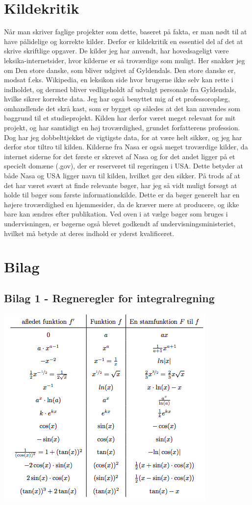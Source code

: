\documentclass[12pt]{article}
\numberwithin{equation}{section}
\begin{document}
\section{Kildekritik}
Når man skriver faglige projekter som dette, baseret på fakta, er man nødt til at have pålidelige og korrekte kilder. Derfor er kildekritik en essentiel del af det at skrive skriftlige opgaver. 
De kilder jeg har anvendt, har hovedsageligt være leksika-internetsider, hvor kilderne er så troværdige som muligt. Her snakker jeg om Den store danske, som bliver udgivet af Gyldendals. Den store danske er, modsat f.eks. Wikipedia, en leksikon side hvor brugerne ikke selv kan rette i indholdet, og dermed bliver vedligeholdt af udvalgt personale fra Gyldendals, hvilke sikrer korrekte data. 
Jeg har også benyttet mig af et professoroplæg, omhandlende det skrå kast, som er bygget op således at det kan anvendes som baggrund til et studieprojekt. Kilden har derfor været meget relevant for mit projekt, og har samtidigt en høj troværdighed, grundet forfatterens profession. Dog har jeg dobbelttjekket de vigtigste data, for at være helt sikker, og jeg har derfor stor tiltro til kilden. 
Kilderne fra Nasa er også meget troværdige kilder, da internet siderne for det første er skrevet af Nasa og for det andet ligger på et specielt domæne (.gov), der er reserveret til regeringen i USA. Dette betyder at både Nasa og USA ligger navn til kilden, hvilket gør den sikker.  
På trods af at det har været svært at finde relevante bøger, har jeg så vidt muligt forsøgt at holde til bøger som første informationskilde. Dette er da bøger generelt har en højere troværdighed en hjemmesider, da de kræver mere at producere, og ikke bare kan ændres efter publikation. Ved oven i at vælge bøger som bruges i undervisningen, er bøgerne også blevet godkendt af undervisningsministeriet, hvilket må betyde at deres indhold er yderst kvalificeret.
\section{Bilag}
\subsection{Bilag 1 - Regneregler for integralregning}
\begin{center}
	\includegraphics[width=0.9\linewidth]{Billeder/Integralregneregler}
\end{center}
\end{document}
